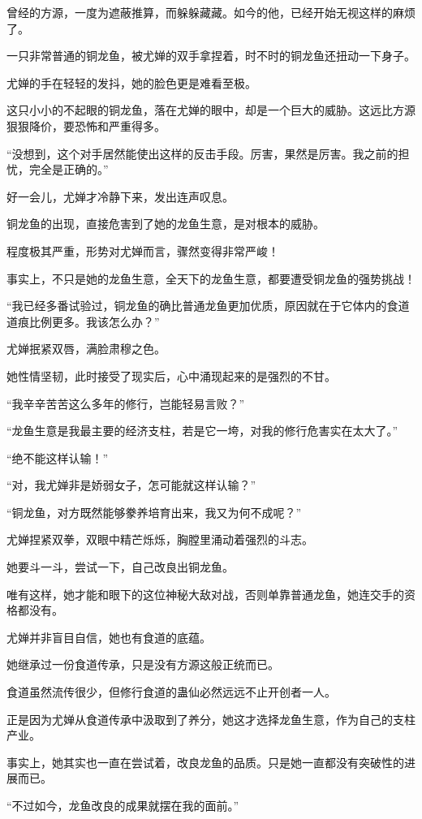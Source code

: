 \begin{this_body}
曾经的方源，一度为遮蔽推算，而躲躲藏藏。如今的他，已经开始无视这样的麻烦了。

一只非常普通的铜龙鱼，被尤婵的双手拿捏着，时不时的铜龙鱼还扭动一下身子。

尤婵的手在轻轻的发抖，她的脸色更是难看至极。

这只小小的不起眼的铜龙鱼，落在尤婵的眼中，却是一个巨大的威胁。这远比方源狠狠降价，要恐怖和严重得多。

“没想到，这个对手居然能使出这样的反击手段。厉害，果然是厉害。我之前的担忧，完全是正确的。”

好一会儿，尤婵才冷静下来，发出连声叹息。

铜龙鱼的出现，直接危害到了她的龙鱼生意，是对根本的威胁。

程度极其严重，形势对尤婵而言，骤然变得非常严峻！

事实上，不只是她的龙鱼生意，全天下的龙鱼生意，都要遭受铜龙鱼的强势挑战！

“我已经多番试验过，铜龙鱼的确比普通龙鱼更加优质，原因就在于它体内的食道道痕比例更多。我该怎么办？”

尤婵抿紧双唇，满脸肃穆之色。

她性情坚韧，此时接受了现实后，心中涌现起来的是强烈的不甘。

“我辛辛苦苦这么多年的修行，岂能轻易言败？”

“龙鱼生意是我最主要的经济支柱，若是它一垮，对我的修行危害实在太大了。”

“绝不能这样认输！”

“对，我尤婵非是娇弱女子，怎可能就这样认输？”

“铜龙鱼，对方既然能够豢养培育出来，我又为何不成呢？”

尤婵捏紧双拳，双眼中精芒烁烁，胸膛里涌动着强烈的斗志。

她要斗一斗，尝试一下，自己改良出铜龙鱼。

唯有这样，她才能和眼下的这位神秘大敌对战，否则单靠普通龙鱼，她连交手的资格都没有。

尤婵并非盲目自信，她也有食道的底蕴。

她继承过一份食道传承，只是没有方源这般正统而已。

食道虽然流传很少，但修行食道的蛊仙必然远远不止开创者一人。

正是因为尤婵从食道传承中汲取到了养分，她这才选择龙鱼生意，作为自己的支柱产业。

事实上，她其实也一直在尝试着，改良龙鱼的品质。只是她一直都没有突破性的进展而已。

“不过如今，龙鱼改良的成果就摆在我的面前。”


\end{this_body}
